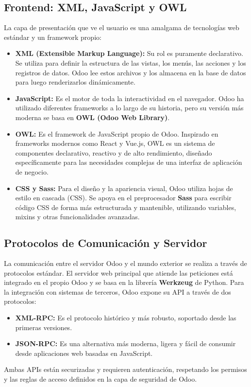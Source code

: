 \documentclass[12pt,letterpaper,spanish]{report}
\begin{document}
\subsection{Frontend: XML, JavaScript y OWL}
La capa de presentación que ve el usuario es una amalgama de tecnologías web estándar y un framework propio:
\begin{itemize}
    \item \textbf{XML (Extensible Markup Language):} Su rol es puramente declarativo. Se utiliza para definir la estructura de las vistas, los menús, las acciones y los registros de datos. Odoo lee estos archivos y los almacena en la base de datos para luego renderizarlos dinámicamente.
    \item \textbf{JavaScript:} Es el motor de toda la interactividad en el navegador. Odoo ha utilizado diferentes frameworks a lo largo de su historia, pero su versión más moderna se basa en \textbf{OWL (Odoo Web Library)}.
    \item \textbf{OWL:} Es el framework de JavaScript propio de Odoo. Inspirado en frameworks modernos como React y Vue.js, OWL es un sistema de componentes declarativo, reactivo y de alto rendimiento, diseñado específicamente para las necesidades complejas de una interfaz de aplicación de negocio.
    \item \textbf{CSS y Sass:} Para el diseño y la apariencia visual, Odoo utiliza hojas de estilo en cascada (CSS). Se apoya en el preprocesador \textbf{Sass} para escribir código CSS de forma más estructurada y mantenible, utilizando variables, mixins y otras funcionalidades avanzadas.
\end{itemize}

\subsection{Protocolos de Comunicación y Servidor}
La comunicación entre el servidor Odoo y el mundo exterior se realiza a través de protocolos estándar. El servidor web principal que atiende las peticiones está integrado en el propio Odoo y se basa en la librería \textbf{Werkzeug} de Python. Para la integración con sistemas de terceros, Odoo expone su API a través de dos protocolos:
\begin{itemize}
    \item \textbf{XML-RPC:} Es el protocolo histórico y más robusto, soportado desde las primeras versiones.
    \item \textbf{JSON-RPC:} Es una alternativa más moderna, ligera y fácil de consumir desde aplicaciones web basadas en JavaScript.
\end{itemize}
Ambas APIs están securizadas y requieren autenticación, respetando los permisos y las reglas de acceso definidos en la capa de seguridad de Odoo.
\end{document}
